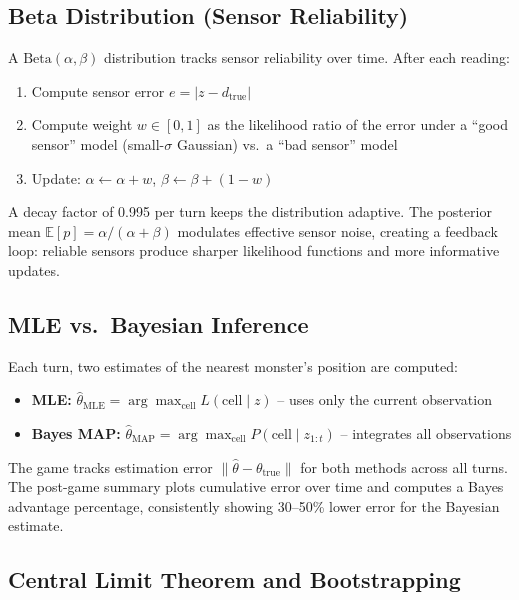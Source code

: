 \documentclass[11pt]{article}
\begin{document}
\subsection{Beta Distribution (Sensor Reliability)}

A $\text{Beta}(\alpha, \beta)$ distribution tracks sensor reliability over time. After each reading:
\begin{enumerate}[nosep]
    \item Compute sensor error $e = |z - d_{\text{true}}|$
    \item Compute weight $w \in [0,1]$ as the likelihood ratio of the error under a ``good sensor'' model (small-$\sigma$ Gaussian) vs.\ a ``bad sensor'' model
    \item Update: $\alpha \leftarrow \alpha + w$, \quad $\beta \leftarrow \beta + (1 - w)$
\end{enumerate}
A decay factor of 0.995 per turn keeps the distribution adaptive. The posterior mean $\mathbb{E}[p] = \alpha / (\alpha + \beta)$ modulates effective sensor noise, creating a feedback loop: reliable sensors produce sharper likelihood functions and more informative updates.

\subsection{MLE vs.\ Bayesian Inference}

Each turn, two estimates of the nearest monster's position are computed:
\begin{itemize}[nosep]
    \item \textbf{MLE:} $\hat{\theta}_{\text{MLE}} = \arg\max_{\text{cell}} L(\text{cell} \mid z)$ -- uses only the current observation
    \item \textbf{Bayes MAP:} $\hat{\theta}_{\text{MAP}} = \arg\max_{\text{cell}} P(\text{cell} \mid z_{1:t})$ -- integrates all observations
\end{itemize}
The game tracks estimation error $\|{\hat{\theta} - \theta_{\text{true}}}\|$ for both methods across all turns. The post-game summary plots cumulative error over time and computes a Bayes advantage percentage, consistently showing 30--50\% lower error for the Bayesian estimate.

\subsection{Central Limit Theorem and Bootstrapping}
\end{document}
